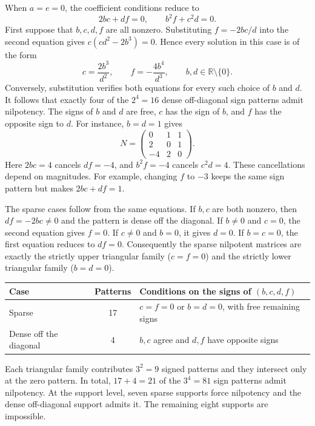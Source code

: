 \documentclass[11pt,a4paper]{article}
\begin{document}
When $a=e=0$, the coefficient conditions reduce to
\begin{equation}\label{eq:zero-diagonal-three}
 2bc+df=0,\qquad b^2f+c^2d=0.
\end{equation}
First suppose that $b,c,d,f$ are all nonzero. Substituting $f=-2bc/d$
into the second equation gives $c(cd^2-2b^3)=0$. Hence every solution
in this case is of the form
\begin{equation}\label{eq:zero-diagonal-param}
 c=\frac{2b^3}{d^2},\qquad f=-\frac{4b^4}{d^3},
 \qquad b,d\in\mathbb R\setminus\{0\}.
\end{equation}
Conversely, substitution verifies both equations for every such choice
of $b$ and $d$. It follows that exactly four of the $2^4=16$ dense
off-diagonal sign patterns admit nilpotency. The signs of $b$ and $d$
are free, $c$ has the sign of $b$, and $f$ has the opposite sign to $d$.
For instance, $b=d=1$ gives
\[
 N=\begin{pmatrix}0&1&1\\2&0&1\\-4&2&0\end{pmatrix}.
\]
Here $2bc=4$ cancels $df=-4$, and $b^2f=-4$ cancels $c^2d=4$.
These cancellations depend on magnitudes. For example, changing
$f$ to $-3$ keeps the same sign pattern but makes $2bc+df=1$.

The sparse cases follow from the same equations. If $b,c$ are both
nonzero, then $df=-2bc\ne0$ and the pattern is dense off the diagonal.
If $b\ne0$ and $c=0$, the second equation gives $f=0$. If $c\ne0$ and
$b=0$, it gives $d=0$. If $b=c=0$, the first equation reduces to $df=0$.
Consequently the sparse nilpotent matrices are exactly the strictly
upper triangular family ($c=f=0$) and the strictly lower triangular
family ($b=d=0$).

\begin{center}
\begin{tabular}{lcl}
\hline
Case & Patterns & Conditions on the signs of $(b,c,d,f)$\\ \hline
Sparse & 17 & $c=f=0$ or $b=d=0$, with free remaining signs\\
Dense off the diagonal & 4 & $b,c$ agree and $d,f$ have opposite signs\\ \hline
\end{tabular}
\end{center}

Each triangular family contributes $3^2=9$ signed patterns and they
intersect only at the zero pattern. In total, $17+4=21$ of the
$3^4=81$ sign patterns admit nilpotency. At the support level, seven
sparse supports force nilpotency and the dense off-diagonal support
admits it. The remaining eight supports are impossible.
\end{document}
